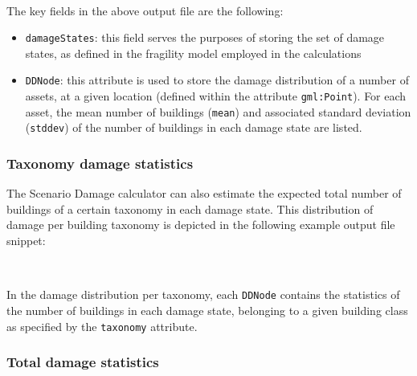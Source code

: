 \inputminted[firstline=1,firstnumber=1,fontsize=\footnotesize,frame=single,bgcolor=lightgray]{xml}{oqum/risk/verbatim/output_scenario_damage_asset.xml}\\

The key fields in the above output file are the following:

\begin{itemize}

  \item \Verb+damageStates+: this field serves the purposes of storing the set
    of damage states, as defined in the \gls{fragility model} employed in the
    calculations

  \item \Verb+DDNode+: this attribute is used to store the damage distribution
    of a number of \glspl{asset}, at a given location (defined within the
    attribute \Verb+gml:Point+). For each \gls{asset}, the mean number of
    buildings (\Verb+mean+) and associated standard deviation (\Verb+stddev+)
    of the number of buildings in each damage state are listed.

\end{itemize}


\subsubsection{Taxonomy damage statistics}
\label{subsubsec:scenario_taxonomy_damage_statistics}

The Scenario Damage calculator can also estimate the expected total number of
buildings of a certain \gls{taxonomy} in each damage state. This distribution
of damage per building \gls{taxonomy} is depicted in the following example
output file snippet:

\inputminted[firstline=1,firstnumber=1,fontsize=\footnotesize,frame=single,linenos,bgcolor=lightgray]{xml}{oqum/risk/verbatim/output_scenario_damage_taxonomy.xml}\\

In the damage distribution per \gls{taxonomy}, each \Verb+DDNode+ contains the
statistics of the number of buildings in each damage state, belonging to a
given building class as specified by the \Verb+taxonomy+ attribute.


\subsubsection{Total damage statistics}
\label{subsubsec:scenario_total_damage_statistics}

